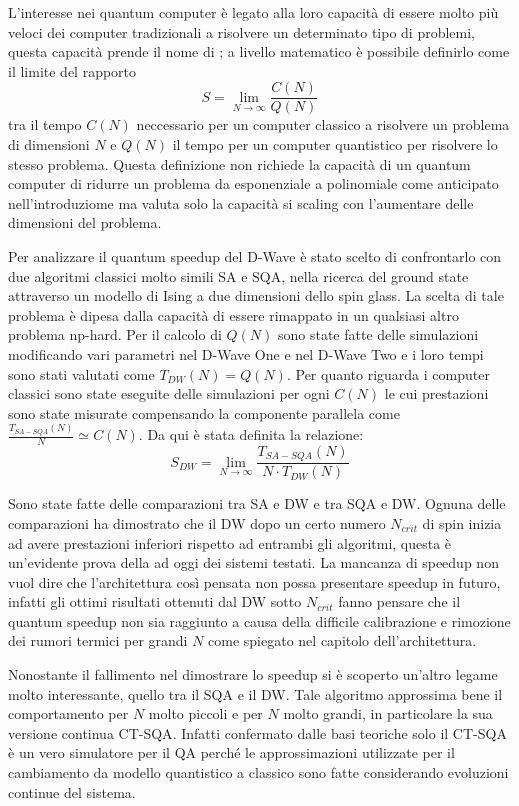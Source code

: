 L'interesse nei quantum computer è legato alla loro capacità di essere molto più veloci dei computer tradizionali a risolvere un determinato tipo di problemi, questa capacità prende il nome di ; a livello matematico è possibile definirlo\cite{DDQS} come il limite del rapporto
$$S = \lim_{N \to \infty} \frac{C(N)}{Q(N)}$$
tra il tempo $C(N)$ neccessario per un computer classico a risolvere un problema di dimensioni $N$ e $Q(N)$ il tempo per un computer quantistico per risolvere lo stesso problema. Questa definizione non richiede la capacità di un quantum computer di ridurre un problema da esponenziale a polinomiale come anticipato nell'introduziome ma valuta solo la capacità si scaling con l'aumentare delle dimensioni del problema.

Per analizzare il quantum speedup del D-Wave è stato scelto di confrontarlo con due algoritmi classici molto simili SA e SQA, nella ricerca del ground state attraverso un modello di Ising a due dimensioni dello spin glass.
La scelta di tale problema è dipesa dalla capacità di essere rimappato in un qualsiasi altro problema np-hard. Per il calcolo di $Q(N)$ sono state fatte delle simulazioni modificando vari parametri nel D-Wave One e nel D-Wave Two e i loro tempi sono stati valutati come $T_{DW}(N) = Q(N)$. Per quanto riguarda i computer classici sono state eseguite delle simulazioni per ogni $C(N)$ le cui prestazioni sono state misurate compensando la componente parallela\cite{EQA} come
 $\frac{T_{SA-SQA}(N)}{N} \simeq C(N)$. Da qui è stata definita\cite{DDQS} la relazione:
$$S_{DW} = \lim_{N \to \infty} \frac{T_{SA-SQA}(N)}{N \cdot T_{DW}(N)}$$

Sono state fatte delle comparazioni tra SA e DW\cite{DDQS} e tra SQA e DW\cite{QVC}. Ognuna delle comparazioni ha dimostrato che il DW dopo un certo numero $N_{crit}$ di spin inizia ad avere prestazioni inferiori rispetto ad entrambi gli algoritmi, questa è un'evidente prova della  ad oggi dei sistemi testati. La mancanza di speedup non vuol dire che l'architettura così pensata non possa presentare speedup in futuro, infatti gli ottimi risultati ottenuti dal DW sotto $N_{crit}$ fanno pensare che il quantum speedup non sia raggiunto a causa della difficile calibrazione e rimozione dei rumori termici per grandi $N$ come spiegato nel capitolo dell'architettura.

Nonostante il fallimento nel dimostrare lo speedup si è scoperto un'altro legame molto interessante, quello tra il SQA e il DW. Tale algoritmo approssima bene il comportamento per $N$ molto piccoli e per $N$ molto grandi\cite{EQA}, in particolare la sua versione continua CT-SQA\cite{QVC}. Infatti confermato dalle basi teoriche solo il CT-SQA è un vero simulatore per il QA perché le approssimazioni utilizzate per il cambiamento da modello quantistico a classico sono fatte considerando evoluzioni continue del sistema.

